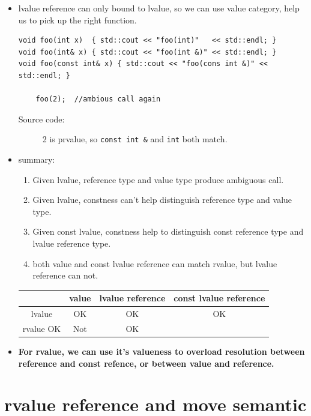 \documentclass[a4paper,11pt,twoside]{book}
\begin{document}
\begin{itemize}
		\item lvalue reference can only bound to lvalue, so we can use value category, help us to pick up the right function.
\begin{lstlisting}[numbers=none]
void foo(int x)  { std::cout << "foo(int)"   << std::endl; }
void foo(int& x) { std::cout << "foo(int &)" << std::endl; }
void foo(const int& x) { std::cout << "foo(cons int &)" << std::endl; }
	
	foo(2);	 //ambious call again
\end{lstlisting}
\begin{description}
	\item[Source code:] 2 is prvalue, so \texttt{const int \&} and \texttt{int} both match.
\end{description}

\item summary:
\begin{enumerate}
	\item Given lvalue, reference type and value type produce ambiguous call.
	\item Given lvalue, constness can't help distinguish reference type and value type.
	\item Given const lvalue, constness help to distinguish const reference type and lvalue reference type.
	\item both value and const lvalue reference can match rvalue, but lvalue reference can not. 
\end{enumerate}
\begin{center}
	\begin{tabular}{|c|c|c|c|}
		\hline
		& value & lvalue reference  & const lvalue reference  \\
		\hline
		lvalue & OK &  OK & OK  \\
		\hline
		rvalue OK & Not & OK &  \\
		\hline
	\end{tabular}
\end{center}

\item \textbf{For rvalue, we can use it's valueness to overload resolution between reference and const refence, or between value and reference.}
\end{itemize}

\section{rvalue reference and move semantic}
\end{document}
